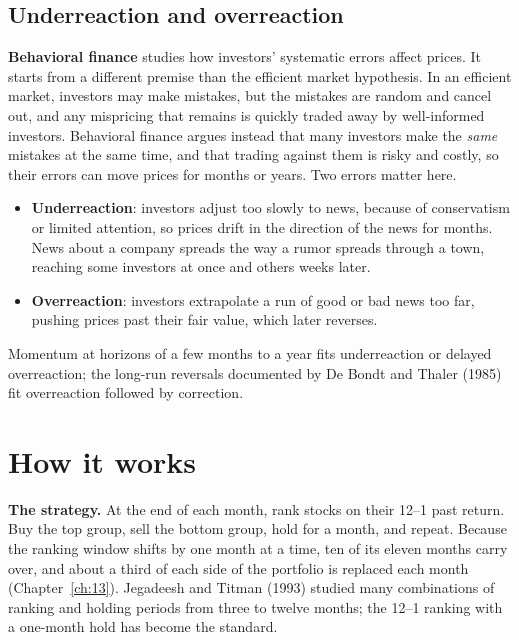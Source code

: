 \subsection{Underreaction and overreaction}
\label{sec:05-behavior}

\textbf{Behavioral finance} studies how investors' systematic errors affect prices. It starts from a different premise than the efficient market hypothesis. In an efficient market, investors may make mistakes, but the mistakes are random and cancel out, and any mispricing that remains is quickly traded away by well-informed investors. Behavioral finance argues instead that many investors make the \emph{same} mistakes at the same time, and that trading against them is risky and costly, so their errors can move prices for months or years. Two errors matter here.

\begin{itemize}
  \item \textbf{Underreaction}: investors adjust too slowly to news, because of conservatism or limited attention, so prices drift in the direction of the news for months. News about a company spreads the way a rumor spreads through a town, reaching some investors at once and others weeks later.
  \item \textbf{Overreaction}: investors extrapolate a run of good or bad news too far, pushing prices past their fair value, which later reverses.
\end{itemize}

Momentum at horizons of a few months to a year fits underreaction or delayed overreaction; the long-run reversals documented by De Bondt and Thaler (1985) fit overreaction followed by correction.


\section{How it works}
\label{sec:05-how}

\textbf{The strategy.} At the end of each month, rank stocks on their 12--1 past return. Buy the top group, sell the bottom group, hold for a month, and repeat. Because the ranking window shifts by one month at a time, ten of its eleven months carry over, and about a third of each side of the portfolio is replaced each month (Chapter~\ref{ch:13}). Jegadeesh and Titman (1993) studied many combinations of ranking and holding periods from three to twelve months; the 12--1 ranking with a one-month hold has become the standard.

